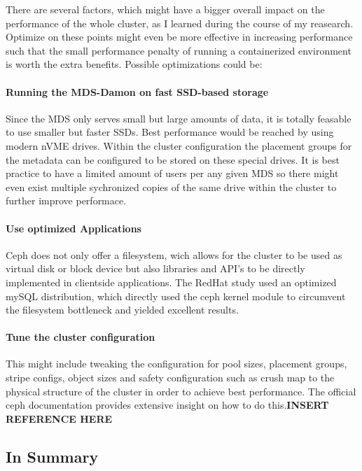 \documentclass[titlepage, a4paper, 11pt]{scrartcl}
\begin{document}
            There are several factors, which might have a bigger overall impact on the performance of the whole cluster, as I learned during the course of my reasearch. Optimize on these points might even be more effective in increasing performance such that the small performance penalty of running a containerized environment is worth the extra benefits. Possible optimizations could be:

            \paragraph{Running the MDS-Damon on fast SSD-based storage} Since the MDS only serves small but large amounts of data, it is totally feasable to use smaller but faster SSDs. Best performance would be reached by using modern nVME drives. Within the cluster configuration the placement groups for the metadata can be configured to be stored on these special drives. It is best practice to have a limited amount of users per any given MDS so there might even exist multiple sychronized copies of the same drive within the cluster to further improve performace.

            \paragraph{Use optimized Applications} Ceph does not only offer a filesystem, wich allows for the cluster to be used as virtual disk or block device but also libraries and API's to be directly implemented in clientside applications. The RedHat study\cite{redhatstudy} used an optimized mySQL distribution, which directly used the ceph kernel module to circumvent the filesystem bottleneck and yielded excellent results.

            \paragraph{Tune the cluster configuration} This might include tweaking the configuration for pool sizes, placement groups, stripe configs, object sizes and safety configuration such as crush map to the physical structure of the cluster in order to achieve best performance. The official ceph documentation provides extensive insight on how to do this.\textbf{INSERT REFERENCE HERE}

        \subsection{In Summary}
\end{document}
